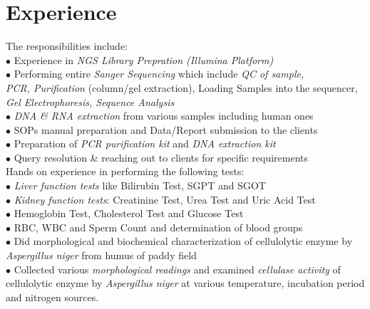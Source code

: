 \documentclass[letterpaper]{twentysecondcv} %
\begin{document}

\section{Experience}

\begin{twenty} %
	{The responsibilities include:\\
	$\bullet$ Experience in \emph{ NGS Library Prepration (Illumina Platform)} \\
	$\bullet$ Performing entire \emph{ Sanger Sequencing} which include \emph{QC of sample,\\ \phantom{i}  PCR, Purification} (column/gel extraction), Loading Samples into \phantom{ix}the sequencer,\emph{ Gel Electrophoresis, Sequence Analysis}\\
	$\bullet$ \emph{ DNA \& RNA extraction} from various samples including human ones\\
	$\bullet$ SOPs manual preparation and Data/Report submission to the clients\\
	$\bullet$ Preparation of\emph{ PCR purification kit} and \emph{ DNA extraction kit}\\
	$\bullet$ Query resolution \& reaching out to clients for specific requirements\\
	}
	{Hands on experience in performing the following tests:\\
	$\bullet$ \emph{Liver function tests} like Bilirubin Test, SGPT and SGOT\\
	$\bullet$\emph{ Kidney function tests}: Creatinine Test, Urea Test and Uric Acid Test\\
	$\bullet$ Hemoglobin Test, Cholesterol Test and  Glucose  Test\\
	$\bullet$ RBC, WBC and Sperm Count and determination of blood groups\\
	}
	{$\bullet$ Did morphological and biochemical characterization of cellulolytic \phantom{ix}enzyme by \emph{Aspergillus niger} from humus of paddy field\\
	$\bullet$ Collected various\emph{ morphological readings} and examined \emph{cellulase  \phantom{ix}activity} of cellulolytic enzyme by \emph{Aspergillus niger} at various \phantom{ix}temperature, incubation period and nitrogen sources.\\\\
	}

\end{twenty}
\end{document}
